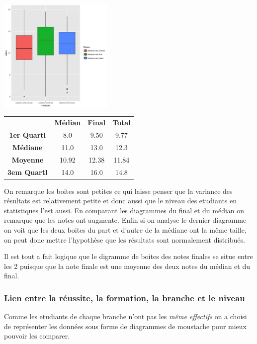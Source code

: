 \documentclass[10pt]{article}
\begin{document}
	\begin{minipage}{.4\textwidth}	
		\includegraphics[width=55mm]{Figures/Notes/boxplot_exam.jpg}
		\label{fig:Boxplot_notes}
	\end{minipage}%
	\hspace{0.03\linewidth}
	\begin{minipage}{.6\textwidth}
		\begin{tabular}{ c c c c }
			\textbf{}       & \textbf{Médian} & \textbf{Final}   & \textbf{Total} \\
			\textbf{1er Quartl}    & 8.0 			       & 9.50		      & 9.77    \\
			\textbf{Médiane  }   &11.0		             & 13.0	            & 12.3    \\
			\textbf{Moyenne}     & 10.92                &  12.38          & 11.84\\
			\textbf{3em Quartl}  & 14.0  				& 16.0 		       & 14.8\\
		\end{tabular}
	\end{minipage}
	
	
	On remarque les boites sont petites ce qui laisse penser que la variance des résultats est relativement petite et donc aussi que le niveau des etudiants en statistiques l'est aussi.  En comparant les diagrammes du final et du médian on remarque que les notes ont augmente.  Enfin si on analyse le dernier diagramme on voit que les deux boites du part et d'autre de la médiane ont la même taille, on peut donc mettre l'hypothèse que les résultats sont normalement distribués. 
	
	Il est tout a fait logique que le digramme de boites des notes finales se situe entre les 2 puisque que la note finale est une moyenne des deux notes du médian et du final.
	
	
	\subsubsection{Lien entre la réussite, la formation, la branche et le niveau}
	Comme les etudiants de chaque branche n'ont pas les \textit{même effectifs} on a choisi de représenter les données sous forme de diagrammes de moustache pour mieux pouvoir les comparer.\\
	
\end{document}
